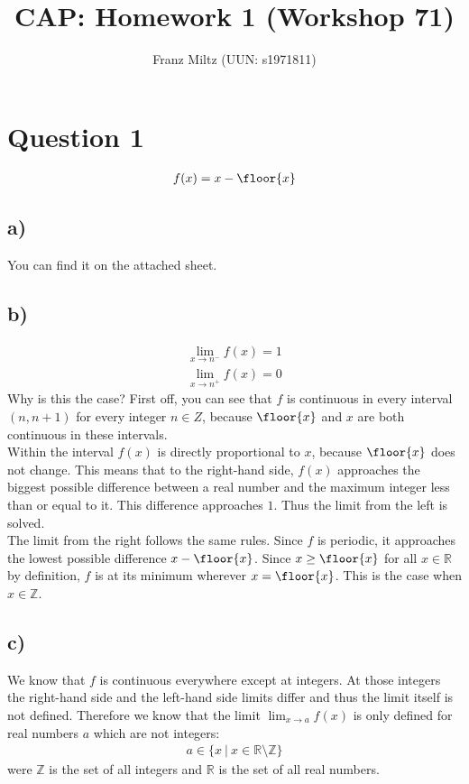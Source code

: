 \documentclass{article}
\title{CAP: Homework 1 (Workshop 71)}
\author{Franz Miltz (UUN: s1971811)}
\begin{document}
\maketitle
\section*{Question 1}
\begin{align*}
	f(x) = x - \floor{x}
\end{align*}
\subsection*{a)}
You can find it on the attached sheet.
\subsection*{b)}
\begin{align*}
	\lim_{x\to n^-}f(x)=1 \\
	\lim_{x\to n^+}f(x)=0
\end{align*}
Why is this the case? First off, you can see that $f$ is continuous in every interval $(n,n+1)$ for every integer $n\in Z$, because $\floor{x}$ and $x$ are both continuous in these intervals.\\
Within the interval $f(x)$ is directly proportional to $x$, because $\floor{x}$ does not change.
This means that to the right-hand side, $f(x)$ approaches the biggest possible difference between a real number and the maximum integer less than or equal to it.
This difference approaches $1$. Thus the limit from the left is solved.\\
The limit from the right follows the same rules.
Since $f$ is periodic, it approaches the lowest possible difference $x-\floor{x}$.
Since $x\geq\floor{x}$ for all $x\in\mathbb{R}$ by definition, $f$ is at its minimum wherever $x=\floor{x}$.
This is the case when $x\in\mathbb{Z}$.
\subsection*{c)}
We know that $f$ is continuous everywhere except at integers. At those integers the right-hand side and the left-hand side limits differ and thus the limit itself is not defined. Therefore we know that the limit $\lim_{x\to a}f(x)$ is only defined for real numbers $a$ which are not integers:
\begin{align*}
	a\in\{x\:|\: x\in\mathbb{R}\setminus\mathbb{Z}\}
\end{align*}
were $\mathbb{Z}$ is the set of all integers and $\mathbb{R}$ is the set of all real numbers.
\end{document}

